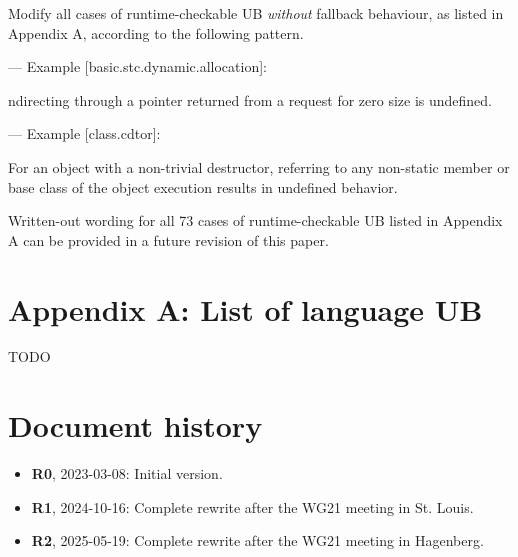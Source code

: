 Modify all cases of runtime-checkable UB \emph{without} fallback behaviour, as listed in Appendix A, according to the following pattern. 

--- Example [basic.stc.dynamic.allocation]:

\begin{adjustwidth}{0.5cm}{0.5cm}
ndirecting through a pointer  returned from a request for zero size is undefined.
\end{adjustwidth}

--- Example [class.cdtor]:

\begin{adjustwidth}{0.5cm}{0.5cm}
For an object with a non-trivial destructor, referring to any non-static member or base class of the object  execution results in undefined behavior.
\end{adjustwidth}

Written-out wording for all 73 cases of runtime-checkable UB listed in Appendix A can be provided in a future revision of this paper.


\section*{Appendix A: List of language UB}

TODO

\section*{Document history}
\begin{itemize}
\item \textbf{R0}, 2023-03-08: Initial version.
\item \textbf{R1}, 2024-10-16: Complete rewrite after the WG21 meeting in St. Louis.
\item \textbf{R2}, 2025-05-19: Complete rewrite after the WG21 meeting in Hagenberg.
\end{itemize}

